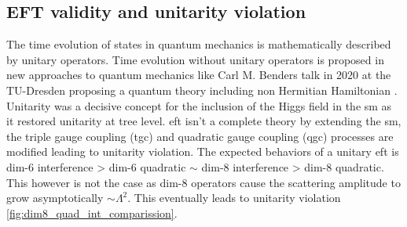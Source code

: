 \documentclass[../Bachelorarbeit.tex]{subfiles}
\begin{document}
\subsection{EFT validity and unitarity violation}
The time evolution of states in quantum mechanics is mathematically described by unitary operators. Time evolution without unitary operators is proposed in new approaches to quantum mechanics like Carl M. Benders talk in 2020 at the TU-Dresden
proposing a quantum theory including non Hermitian Hamiltonian \cite{Prof.Dr.CarlBender.2020}. Unitarity was a decisive concept for the inclusion of the Higgs field in the \acrshort{sm} as it restored unitarity at tree level.
\acrshort{eft} isn't a complete theory by extending the \acrshort{sm}, the triple gauge coupling (\acrshort{tgc}) and quadratic gauge coupling (\acrshort{qgc}) processes are modified leading to unitarity violation. The expected behaviors of a unitary \acrshort{eft} is dim-6 interference > dim-6 quadratic $\sim$ dim-8 interference > dim-8 quadratic.
This however is not the case as dim-8 operators cause the scattering amplitude to grow asymptotically $\sim \Lambda^{2}$. This eventually leads to unitarity violation \ref{fig:dim8_quad_int_comparission}.
\end{document}
